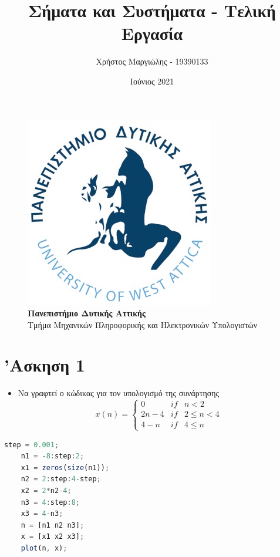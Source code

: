 \documentclass{article}
\title{Σήματα και Συστήματα - Τελική Εργασία}
\author{Χρήστος Μαργιώλης - 19390133}
\date{Ιούνιος 2021}
\begin{document}
\begin{titlepage}
        \maketitle
        \begin{figure}[t!]
        \begin{center}
        \includegraphics[scale=0.3]{./res/uniwalogo.png} \\
        \Large
        \textbf{Πανεπιστήμιο Δυτικής Αττικής} \\
        \large
        Τμήμα Μηχανικών Πληροφορικής και Ηλεκτρονικών Υπολογιστών
        \end{center}
        \end{figure}
\end{titlepage}

\renewcommand{\contentsname}{Περιεχόμενα}
\tableofcontents

\section{'Ασκηση 1}

\begin{itemize}
	\item Να γραφτεί ο κώδικας για τον υπολογισμό της συνάρτησης
	\[
		x(n) = 
		\left\{
			\begin{array}{lll}
			0 & if & n < 2 \\
			2n-4 & if & 2 \leq n < 4 \\
			4-n & if & 4 \leq n
		\end{array}
		\right.
	\]

\end{itemize}

\begin{lstlisting}[language=octave]
	step = 0.001;
	n1 = -8:step:2;
	x1 = zeros(size(n1));
	n2 = 2:step:4-step;
	x2 = 2*n2-4;
	n3 = 4:step:8;
	x3 = 4-n3;
	n = [n1 n2 n3];
	x = [x1 x2 x3];
	plot(n, x);
\end{lstlisting}
\end{document}
